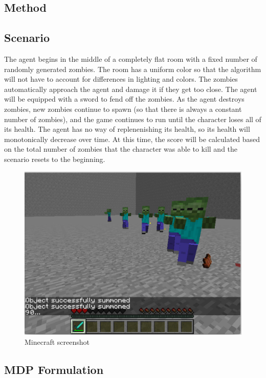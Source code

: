 \documentclass{article}
\begin{document}
\begin{multicols}{2}
\section{Method}



\subsection{Scenario}

The agent begins in the middle of a completely flat room with a fixed number of randomly generated zombies. The room has a uniform color so that the algorithm will not have to account for differences in lighting and colors. The zombies automatically approach the agent and damage it if they get too close. The agent will be equipped with a sword to fend off the zombies. As the agent destroys zombies, new zombies continue to spawn (so that there is always a constant number of zombies), and the game continues to run until the character loses all of its health. The agent has no way of replenenishing its health, so its health will monotonically decrease over time. At this time, the score will be calculated based on the total number of zombies that the character was able to kill and the scenario resets to the beginning.

\begin{figure}[H]
\caption{Minecraft screenshot}
\centering
\includegraphics[scale=0.3]{./hiro_screenshot.png}
\end{figure}

\subsection{MDP Formulation}


\end{multicols}
\end{document}

